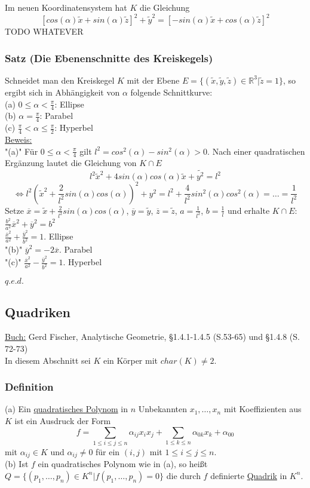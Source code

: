 \documentclass[a4paper]{article}
\newcommand{\ul}{\underline}
\renewcommand{\proof}{\ul{Beweis:}\\}
\renewcommand{\qed}{\begin{flushright}
\ul{\(q.e.d.\)}
\end{flushright}}
\begin{document}
Im neuen Koordinatensystem hat \(K\) die Gleichung
$$\left[cos(\alpha)\tilde{x}+sin(\alpha)\tilde{z}\right]^2+\tilde{y}^2=\left[-sin(\alpha)\tilde{x}+cos(\alpha)\tilde{z}\right]^2$$
TODO WHATEVER
\subsubsection{Satz (Die Ebenenschnitte des Kreiskegels)}
Schneidet man den Kreiskegel \(K\) mit der Ebene \(E=\{(\tilde{x},\tilde{y},\tilde{z})\in\mathbb{R}^3|\tilde{z}=1\}\), so ergibt sich in Abhängigkeit von \(\alpha\) folgende Schnittkurve:\\
(a) \(0\leq \alpha < \frac{\pi}{4}\): Ellipse\\
(b) \(\alpha=\frac{\pi}{4}\): Parabel\\
(c) \(\frac{\pi}{4}<\alpha\leq \frac{\pi}{2}\): Hyperbel\\
\proof
"(a)" Für \(0\leq\alpha <\frac{\pi}{4}\) gilt \(l^2=cos^2(\alpha)-sin^2(\alpha)>0\). Nach einer quadratischen Ergänzung lautet die Gleichung von \(K\cap E\)
$$l^2\tilde{x}^2+4sin(\alpha)cos(\alpha)\tilde{x}+\tilde{y^2}=l^2$$
$$\Leftrightarrow l^2(\tilde{x}^2+\frac{2}{l^2}sin(\alpha)cos(\alpha))^2+y^2=l^2+\frac{4}{l^2}sin^2(\alpha)cos^2(\alpha)=\dots=\frac{1}{l^2}$$
Setze \(\overline{x}=\tilde{x}+\frac{2}{l^2}sin(\alpha)cos(\alpha)\), \(\overline{y}=\tilde{y}\), \(\overline{z}=\tilde{z}\), \(a=\frac{1}{l^2}\), \(b=\frac{1}{l}\) und erhalte \(K\cap E\):\\ \(\frac{b^2}{a^2}\overline{x}^2+\overline{y}^2=b^2\)\\
\(\frac{\overline{x}^2}{a^2}+\frac{\overline{y}^2}{b^2}=1\). Ellipse\\
"(b)" \(\overline{y}^2=-2\overline{x}\). Parabel\\
"(c)" \(\frac{\overline{x}^2}{a^2}-\frac{\overline{y}^2}{b^2}=1\). Hyperbel
\qed
\subsection{Quadriken}
\ul{Buch:} Gerd Fischer, Analytische Geometrie, §1.4.1-1.4.5 (S.53-65) und §1.4.8 (S. 72-73)\\
In diesem Abschnitt sei \(K\) ein Körper mit \(char(K)\neq 2\). 
\subsubsection{Definition}
(a) Ein \ul{quadratisches Polynom} in \(n\) Unbekannten \(x_1,\dots,x_n\) mit Koeffizienten aus \(K\) ist ein Ausdruck der Form
$$f=\sum_{1\leq i\leq j\leq n} \alpha_{ij}x_ix_j+\sum_{1\leq k\leq n}\alpha_{0k}x_k+\alpha_{00}$$
mit \(\alpha_{ij}\in K\) und \(\alpha_{ij}\neq 0\) für ein \((i,j)\) mit \(1\leq i\leq j\leq n\).\\
(b) Ist \(f\) ein quadratisches Polynom wie in (a), so heißt \(Q=\{(p_1,\dots,p_n)\in K^n|f(p_1,\dots,p_n)=0\}\) die durch \(f\) definierte \ul{Quadrik} in \(K^n\).
\end{document}
